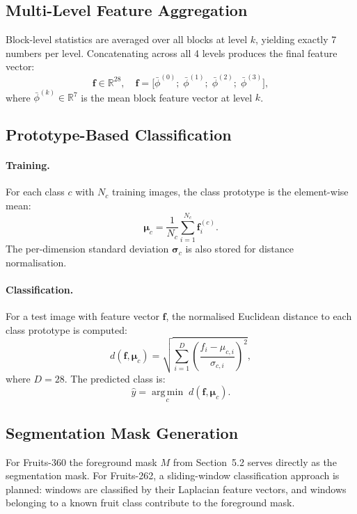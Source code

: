 \documentclass[11pt,a4paper]{article}
\begin{document}
\subsection{Multi-Level Feature Aggregation}

Block-level statistics are averaged over all blocks at level $k$, yielding
exactly 7 numbers per level.  Concatenating across all 4 levels produces the
final feature vector:
\[
  \mathbf{f} \in \mathbb{R}^{28}, \quad
  \mathbf{f} = \bigl[\bar{\phi}^{(0)};\; \bar{\phi}^{(1)};\;
                      \bar{\phi}^{(2)};\; \bar{\phi}^{(3)}\bigr],
\]
where $\bar{\phi}^{(k)} \in \mathbb{R}^{7}$ is the mean block feature vector
at level $k$.

\subsection{Prototype-Based Classification}

\paragraph{Training.}
For each class $c$ with $N_c$ training images, the class prototype is the
element-wise mean:
\[
  \boldsymbol{\mu}_c = \frac{1}{N_c} \sum_{i=1}^{N_c} \mathbf{f}_i^{(c)}.
\]
The per-dimension standard deviation $\boldsymbol{\sigma}_c$ is also stored
for distance normalisation.

\paragraph{Classification.}
For a test image with feature vector $\mathbf{f}$, the normalised Euclidean
distance to each class prototype is computed:
\begin{equation}
  d(\mathbf{f}, \boldsymbol{\mu}_c) =
  \sqrt{\sum_{i=1}^{D}
        \left(\frac{f_i - \mu_{c,i}}{\sigma_{c,i}}\right)^2},
  \label{eq:distance}
\end{equation}
where $D = 28$.  The predicted class is:
\[
  \hat{y} = \operatorname*{arg\,min}_{c}\; d(\mathbf{f}, \boldsymbol{\mu}_c).
\]

\subsection{Segmentation Mask Generation}

For Fruits-360 the foreground mask $M$ from Section~5.2 serves directly as
the segmentation mask.  For Fruits-262, a sliding-window classification
approach is planned: windows are classified by their Laplacian feature vectors,
and windows belonging to a known fruit class contribute to the foreground mask.
\end{document}
